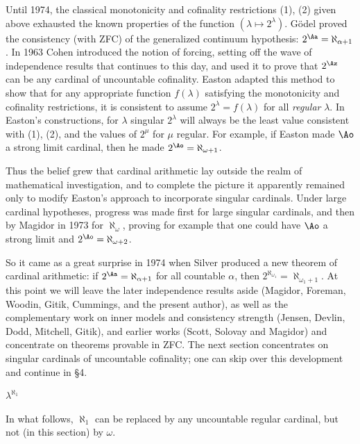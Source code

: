 Until 1974, the classical monotonicity and cofinality 
restrictions  (1),
(2) given
 above exhausted the known
properties of the function $(\lambda\mapsto 2^\lambda)$. 
G\"odel proved
the consistency (with ZFC) of the generalized continuum 
hypothesis:
$2^\Aa=\aleph_{\alpha+1}$. In 1963 Cohen introduced the 
notion of
forcing, setting off the wave of independence results that 
continues
to this day, and used it to prove that $2^\Az$ can be any 
cardinal of
uncountable cofinality. Easton adapted this method to show 
that for
any appropriate
function $f(\lambda)$ satisfying the monotonicity and 
cofinality
restrictions, it is consistent to assume 
$2^\lambda=f(\lambda)$ for all
{\it regular\/} $\lambda$. In Easton's constructions, for 
$\lambda$ singular
 $2^\lambda$ will
always be the least value consistent with (1), (2), and 
the values of
$2^\mu$ for $\mu$ regular. For example, if Easton made 
$\Ao$ a
strong limit cardinal, then he made $2^\Ao=\aleph_{\omega+
1}$.
 
Thus the belief grew that cardinal arithmetic lay outside 
the realm of
mathematical investigation, and to complete the picture it 
apparently
remained only to modify Easton's approach to incorporate 
singular
cardinals.  Under large cardinal hypotheses, progress was 
made first for
 large singular cardinals, and then by Magidor in 1973 for
$\aleph_\omega$, proving for example that one could have 
$\Ao$ a
strong limit and $2^\Ao=\aleph_{\omega+2}$.
 
So it came as a great surprise in 1974 when Silver 
produced a new
theorem of cardinal arithmetic: if $2^{\Aa}=\aleph_{\alpha+
1}$ for all
countable $\alpha$, then 
$2^{\aleph_{\omega_1}}=\aleph_{\omega_1+1}$.
At this point we will leave the later independence results 
aside
(Magidor, Foreman, Woodin, Gitik, Cummings, and the 
present author), as well as
the complementary work on inner models and consistency 
strength
(Jensen, Devlin, Dodd, Mitchell, Gitik), and earlier works 
(Scott,
Solovay and Magidor) and concentrate on theorems provable 
in ZFC.  The
next section concentrates on singular cardinals of 
uncountable
cofinality; one can skip over this development
and continue in \S4.
 
{} $\lambda^{\aleph_1}$\endheading
 
In what follows, $\aleph_1$ can be replaced by any 
uncountable regular
cardinal, but not (in this section) by $\omega$.
 
